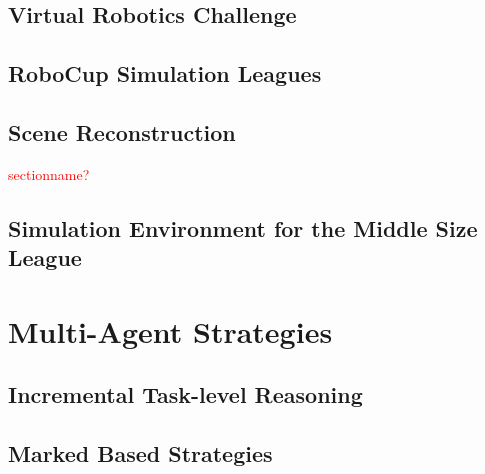 \subsection{Virtual Robotics Challenge}
\subsection{RoboCup Simulation Leagues}
\subsection{Scene Reconstruction}
\textcolor{red}{sectionname?}
\subsection{Simulation Environment for the Middle Size League}

\section{Multi-Agent Strategies}
\subsection{Incremental Task-level Reasoning}
\subsection{Marked Based Strategies}

